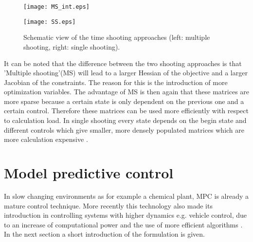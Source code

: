 \begin{figure}[htp]
	\centering
	\begin{minipage}{0.49\textwidth}
		\centering
		\texttt{[image: MS\_int.eps]}
	\end{minipage}
	\hfill
	\begin{minipage}{.49\textwidth}
		\centering
		\texttt{[image: SS.eps]}
	\end{minipage}
	\caption{Schematic view of the time shooting approaches (left: multiple shooting, right: single shooting).}
	\label{fig:TS}
\end{figure}

It can be noted that the difference between the two shooting approaches is that 'Multiple shooting'(MS) will lead to a larger Hessian of the objective and a larger Jacobian of the constraints. The reason for this is the introduction of more optimization variables. The advantage of MS is then again that these matrices are more sparse because a certain state is only dependent on the previous one and a certain control. Therefore these matrices can be used more efficiently with respect to calculation load. In single shooting every state depends on the begin state and different controls which give smaller, more densely populated matrices which are more calculation expensive \cite{Gillis2019}.

\section{Model predictive control}
\label{s:MPC_e}
In slow changing environments as for example a chemical plant, MPC is already a mature control technique. More recently this technology also made its introduction in controlling systems with higher dynamics e.g. vehicle control, due to an increase of computational power and the use of more efficient algorithms \cite{Mercy2018}. In the next section a short introduction of the formulation is given. \\

